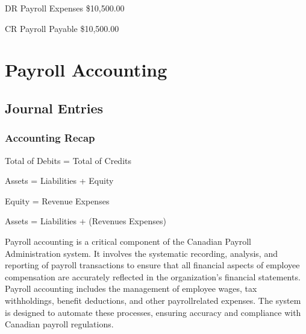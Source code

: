 \documentclass[letterpaper,10pt,english]{sphinxmanual}
\begin{document}
\begin{DUlineblock}{0em}
\item[] DR    Payroll Expenses    \$10,500.00
\item[]
\begin{DUlineblock}{\DUlineblockindent}
\item[] CR  Payroll Payable   \$10,500.00
\end{DUlineblock}
\end{DUlineblock}

\sphinxstepscope


\chapter{Payroll Accounting}
\label{\detokenize{payroll_accounting:payroll-accounting}}\label{\detokenize{payroll_accounting::doc}}

\section{Journal Entries}
\label{\detokenize{payroll_accounting:journal-entries}}

\subsection{Accounting Recap}
\label{\detokenize{payroll_accounting:accounting-recap}}
\sphinxAtStartPar
Total of Debits = Total of Credits

\sphinxAtStartPar
Assets = Liabilities + Equity

\sphinxAtStartPar
Equity = Revenue \sphinxhyphen{} Expenses

\sphinxAtStartPar
Assets = Liabilities + (Revenues \sphinxhyphen{} Expenses)

\sphinxAtStartPar
Payroll accounting is a critical component of the Canadian Payroll Administration system. It involves the systematic recording, analysis, and reporting of payroll transactions to ensure that all financial aspects of employee compensation are accurately reflected in the organization’s financial statements.
Payroll accounting includes the management of employee wages, tax withholdings, benefit deductions, and other payroll\sphinxhyphen{}related expenses. The system is designed to automate these processes, ensuring accuracy and compliance with Canadian payroll regulations.
\end{document}
